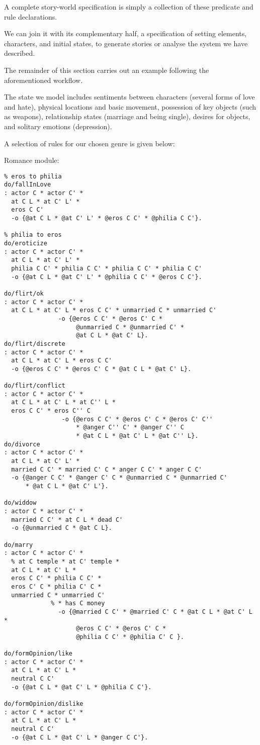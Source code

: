 \documentclass[letterpaper]{article}
\begin{document}
A complete story-world specification is simply a collection of these predicate
and rule declarations.

We can join it with its complementary half, a specification of setting
elements, characters, and initial states, to generate stories or analyse
the system we have described.

The remainder of this section carries out an example following the
aforementioned workflow.

The state we model includes sentiments between characters (several forms of
love and hate), physical locations and basic movement, possession of key
objects (such as weapons), relationship states (marriage and being single),
desires for objects, and solitary emotions (depression).


A selection of rules for our chosen genre is given below:

Romance module:
\begin{verbatim}
% eros to philia
do/fallInLove
: actor C * actor C' *
  at C L * at C' L' *
  eros C C'
  -o {@at C L * @at C' L' * @eros C C' * @philia C C'}.

% philia to eros
do/eroticize
: actor C * actor C' *
  at C L * at C' L' *
  philia C C' * philia C C' * philia C C' * philia C C'
  -o {@at C L * @at C' L' * @philia C C' * @eros C C'}.

do/flirt/ok
: actor C * actor C' *
  at C L * at C' L * eros C C' * unmarried C * unmarried C'
               -o {@eros C C' * @eros C' C * 
                    @unmarried C * @unmarried C' *
                    @at C L * @at C' L}.
do/flirt/discrete
: actor C * actor C' *
  at C L * at C' L * eros C C'
  -o {@eros C C' * @eros C' C * @at C L * @at C' L}.

do/flirt/conflict 
: actor C * actor C' *
  at C L * at C' L * at C'' L *
  eros C C' * eros C'' C
                -o {@eros C C' * @eros C' C * @eros C' C'' 
                    * @anger C'' C' * @anger C'' C
                    * @at C L * @at C' L * @at C'' L}.
do/divorce
: actor C * actor C' *
  at C L * at C' L' *
  married C C' * married C' C * anger C C' * anger C C'
  -o {@anger C C' * @anger C' C * @unmarried C * @unmarried C'
      * @at C L * @at C' L'}.

do/widdow
: actor C * actor C' *
  married C C' * at C L * dead C'
  -o {@unmarried C * @at C L}.

do/marry 
: actor C * actor C' *
  % at C temple * at C' temple * 
  at C L * at C' L * 
  eros C C' * philia C C' * 
  eros C' C * philia C' C * 
  unmarried C * unmarried C'
             % * has C money
               -o {@married C C' * @married C' C * @at C L * @at C' L *
                    @eros C C' * @eros C' C *
                    @philia C C' * @philia C' C }.

do/formOpinion/like
: actor C * actor C' *
  at C L * at C' L *
  neutral C C'
  -o {@at C L * @at C' L * @philia C C'}.

do/formOpinion/dislike
: actor C * actor C' *
  at C L * at C' L *
  neutral C C'
  -o {@at C L * @at C' L * @anger C C'}.
\end{verbatim}
\end{document}
